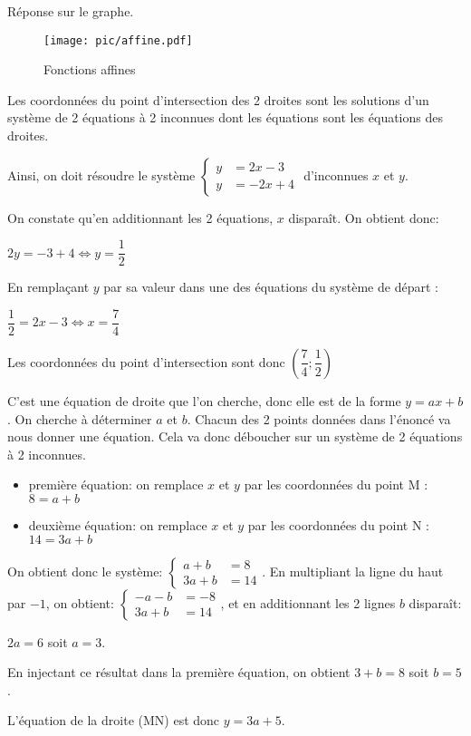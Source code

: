 \documentclass[a4paper,11pt]{scrartcl}
\begin{document}
\question{}
Réponse sur le graphe.

\begin{figure}
\begin{center}
\texttt{[image: pic/affine.pdf]}
\end{center}
\caption{Fonctions affines}
\end{figure}


Les coordonnées du point d'intersection des 2 droites sont les solutions d'un système de 2 équations à 2 inconnues dont les équations sont les équations des droites. 

Ainsi, on doit résoudre le système 
$
\begin{cases}
y &= 2x-3\\ 
y &= -2x+4
\end{cases}
$
d'inconnues $x$ et $y$.

On constate qu'en additionnant les 2 équations, $x$ disparaît. On obtient donc: 

$2y = -3+4 \Leftrightarrow y = \dfrac{1}{2}$

En remplaçant $y$ par sa valeur dans une des équations du système de départ :

$\dfrac{1}{2} = 2x-3 \Leftrightarrow x = \dfrac{7}{4}$

Les coordonnées du point d'intersection sont donc $\left(\dfrac{7}{4};\dfrac{1}{2}\right)$


C'est une équation de droite que l'on cherche, donc elle est de la forme $y = ax+b$. On cherche à déterminer $a$ et $b$. Chacun des 2 points données dans l'énoncé va nous donner une équation. Cela va donc déboucher sur un système de 2 équations à 2 inconnues. 

\begin{itemize}
\item première équation: on remplace $x$ et $y$ par les coordonnées du point M : $8 = a+b$
\item deuxième équation: on remplace $x$ et $y$ par les coordonnées du point N : $14 = 3a+b$
\end{itemize}

On obtient donc le système: 
$
\begin{cases}
a+b &= 8\\ 
3a+b &= 14
\end{cases}
$.
En multipliant la ligne du haut par $-1$, on obtient: 
$
\begin{cases}
-a-b &= -8\\ 
3a+b &= 14
\end{cases}
$, et en additionnant les 2 lignes $b$ disparaît:

$2a = 6$ soit $a = 3$.

En injectant ce résultat dans la première équation, on obtient $3+b = 8$ soit $b = 5$.

L'équation de la droite (MN) est donc $y = 3a+5$.

\trait

\end{document}

